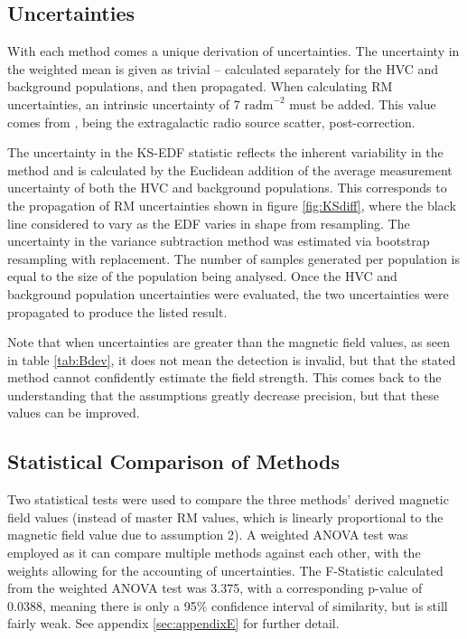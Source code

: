\subsection{Uncertainties}
\label{ssec:results_uncertainties}

With each method comes a unique derivation of uncertainties. The uncertainty in the weighted mean is given as trivial – calculated separately for the HVC and background populations, and then propagated. When calculating RM uncertainties, an intrinsic uncertainty of 7 $\mathrm{rad m}^{-2}$ must be added. This value comes from \cite{ID21}, being the extragalactic radio source scatter, post-correction.


The uncertainty in the KS-EDF statistic reflects the inherent variability in the method and is calculated by the Euclidean addition of the average measurement uncertainty of both the HVC and background populations. This corresponds to the propagation of RM uncertainties shown in figure \ref{fig:KSdiff}, where the black line considered to vary as the EDF varies in shape from resampling. The uncertainty in the variance subtraction method was estimated via bootstrap resampling with replacement. The number of samples generated per population is equal to the size of the population being analysed. Once the HVC and background population uncertainties were evaluated, the two uncertainties were propagated to produce the listed result.

Note that when uncertainties are greater than the magnetic field values, as seen in table \ref{tab:Bdev}, it does not mean the detection is invalid, but that the stated method cannot confidently estimate the field strength. This comes back to the understanding that the assumptions greatly decrease precision, but that these values can be improved.

\subsection{Statistical Comparison of Methods}
\label{ssec:results_stats}

Two statistical tests were used to compare the three methods' derived magnetic field values (instead of master RM values, which is linearly proportional to the magnetic field value due to assumption 2). A weighted ANOVA test was employed as it can compare multiple methods against each other, with the weights allowing for the accounting of uncertainties. The F-Statistic calculated from the weighted ANOVA test was 3.375, with a corresponding p-value of 0.0388, meaning there is only a 95\% confidence interval of similarity, but is still fairly weak. See appendix \ref{sec:appendixE} for further detail.

